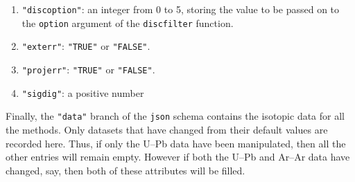 \begin{refsection}
\begin{enumerate}[leftmargin=\parindent,align=left,
      labelwidth=\parindent,label*=2.\arabic*.]
\begin{enumerate}[leftmargin=\parindent,align=left,
      labelwidth=\parindent,label*=\arabic*.]
      (calculate the discordance after common Pb correction).
    \item{\tt "discoption"}: an integer from 0 to 5, storing the value
      to be passed on to the \texttt{option} argument of the
      \texttt{discfilter} function.
    \item{\tt "exterr"}: \texttt{"TRUE"} or \texttt{"FALSE"}.
      \item{\tt "projerr"}: \texttt{"TRUE"} or \texttt{"FALSE"}.
    \item{\tt "sigdig"}: a positive number
  \end{enumerate}
\end{enumerate}

Finally, the \texttt{"data"} branch of the \texttt{json} schema
contains the isotopic data for all the methods. Only datasets that
have changed from their default values are recorded here. Thus, if
only the U--Pb data have been manipulated, then all the other entries
will remain empty. However if both the U--Pb and Ar--Ar data have
changed, say, then both of these attributes will be filled.


\end{refsection}
